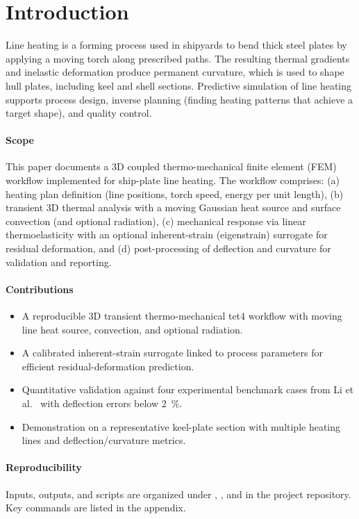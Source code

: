 \section{Introduction}
\label{sec:intro}

Line heating is a forming process used in shipyards to bend thick steel plates by applying a moving torch along prescribed paths. The resulting thermal gradients and inelastic deformation produce permanent curvature, which is used to shape hull plates, including keel and shell sections. Predictive simulation of line heating supports process design, inverse planning (finding heating patterns that achieve a target shape), and quality control.

\paragraph{Scope}
This paper documents a 3D coupled thermo-mechanical finite element (FEM) workflow implemented for ship-plate line heating. The workflow comprises: (a) heating plan definition (line positions, torch speed, energy per unit length), (b) transient 3D thermal analysis with a moving Gaussian heat source and surface convection (and optional radiation), (c) mechanical response via linear thermoelasticity with an optional inherent-strain (eigenstrain) surrogate for residual deformation, and (d) post-processing of deflection and curvature for validation and reporting.

\paragraph{Contributions}
\begin{itemize}
  \item A reproducible 3D transient thermo-mechanical tet4 workflow with moving line heat source, convection, and optional radiation.
  \item A calibrated inherent-strain surrogate linked to process parameters for efficient residual-deformation prediction.
  \item Quantitative validation against four experimental benchmark cases from Li et al.\ \cite{li2023} with deflection errors below \SI{2}{\%}.
  \item Demonstration on a representative keel-plate section with multiple heating lines and deflection/curvature metrics.
\end{itemize}

\paragraph{Reproducibility}
Inputs, outputs, and scripts are organized under , , and  in the project repository. Key commands are listed in the appendix.
